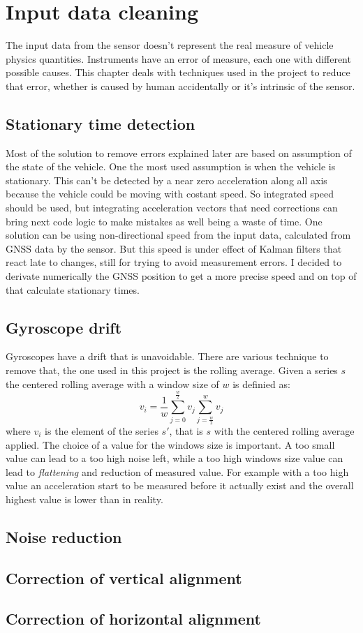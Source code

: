 \chapter{Input data cleaning}
\label{chap:input_data_cleaning}

The input data from the sensor doesn't represent the real measure of vehicle physics quantities. Instruments have an error of measure, each one with different possible causes. This chapter deals with techniques used in the project to reduce that error, whether is caused by human accidentally or it's intrinsic of the sensor.

\section{Stationary time detection}
Most of the solution to remove errors explained later are based on assumption of the state of the vehicle. One the most used assumption is when the vehicle is stationary.
This can't be detected by a near zero acceleration along all axis because the vehicle could be moving with costant speed. So integrated speed should be used, but integrating acceleration vectors that need corrections can bring next code logic to make mistakes as well being a waste of time. 
One solution can be using non-directional speed from the input data, calculated from GNSS data by the sensor. But this speed is under effect of Kalman filters that react late to changes, still for trying to avoid measurement errors. I decided to derivate numerically the GNSS position to get a more precise speed and on top of that calculate stationary times.  

\section{Gyroscope drift}
Gyroscopes have a drift that is unavoidable. \cite{6727722}
There are various technique to remove that, the one used in this project is the rolling average. 
Given a series $s$ the centered rolling average with a window size of $w$ is definied as:
$$ v_i = \frac{1}{w} \sum_{j=0}^{\frac{w}{2}}v_j \sum_{j=\frac{w}{2}}^{w}v_j $$
where $v_i$ is the element of the series $s'$, that is $s$ with the centered rolling average applied.
The choice of a value for the windows size is important. A too small value can lead to a too high noise left, while a too high windows size value can lead to \textit{flattening} and reduction of measured value. For example with a too high value an acceleration start to be measured before it actually exist and the overall highest value is lower than in reality.

\section{Noise reduction}

\section{Correction of vertical alignment}

\section{Correction of horizontal alignment}
